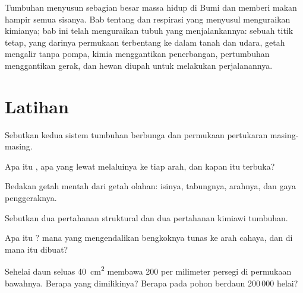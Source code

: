 \begin{remark}\label{rem:g12:plant-rooted-life:half}
Tumbuhan menyusun sebagian besar massa hidup di Bumi dan memberi makan
hampir semua sisanya. Bab tentang  dan respirasi yang
menyusul menguraikan kimianya; bab ini telah menguraikan tubuh yang
menjalankannya: sebuah titik tetap, yang darinya permukaan terbentang
ke dalam tanah dan udara, getah mengalir tanpa pompa, kimia
menggantikan penerbangan, pertumbuhan menggantikan gerak, dan hewan
diupah untuk melakukan perjalanannya.
\end{remark}

\section{Latihan}

\begin{exercise}[$\star$]\label{exo:g12:plant-rooted-life:1}
Sebutkan kedua sistem tumbuhan berbunga dan permukaan pertukaran
masing-masing.
\end{exercise}

\begin{exercise}[$\star$]\label{exo:g12:plant-rooted-life:2}
Apa itu , apa yang lewat melaluinya ke tiap arah, dan kapan 
itu terbuka?
\end{exercise}

\begin{exercise}[$\star$]\label{exo:g12:plant-rooted-life:3}
Bedakan getah mentah dari getah olahan: isinya, tabungnya, arahnya,
dan gaya penggeraknya.
\end{exercise}

\begin{exercise}[$\star$]\label{exo:g12:plant-rooted-life:4}
Sebutkan dua pertahanan struktural dan dua pertahanan kimiawi tumbuhan.
\end{exercise}

\begin{exercise}[$\star$]\label{exo:g12:plant-rooted-life:5}
Apa itu ?  mana yang mengendalikan bengkoknya tunas ke
arah cahaya, dan di mana  itu dibuat?
\end{exercise}

\begin{exercise}[$\star\star$]\label{exo:g12:plant-rooted-life:6}
Sehelai daun seluas \qty{40}{cm^2} membawa 200  per milimeter
persegi di permukaan bawahnya. Berapa  yang dimilikinya? Berapa
pada pohon berdaun 200\,000 helai?
\end{exercise}


